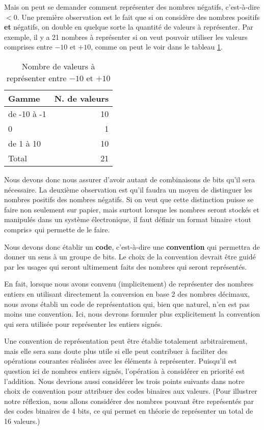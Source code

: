 \documentclass[11pt]{article}
\begin{document}
Mais on peut se demander comment représenter des nombres négatifs,
c'est-à-dire \(< 0\). Une première observation est le fait que si on
considère des nombres positifs \textbf{et} négatifs, on double en quelque
sorte la quantité de valeurs à représenter. Par exemple, il y a 21
nombres à représenter si on veut pouvoir utiliser les valeurs
comprises entre \(-10\) et \(+10\), comme on peut le voir dans le
tableau \ref{tab:orgaae360a}.

\begin{table}[htbp]
\caption{\label{tab:orgaae360a}Nombre de valeurs à représenter entre \(-10\) et \(+10\)}
\centering
\begin{tabular}{lr}
Gamme & N. de valeurs\\[0pt]
\hline
de -10 à -1 & 10\\[0pt]
0 & 1\\[0pt]
de 1 à 10 & 10\\[0pt]
\hline
Total & 21\\[0pt]
\end{tabular}
\end{table}

Nous devons donc nous assurer d'avoir autant de combinaisons de bits
qu'il sera nécessaire. La deuxième observation est qu'il faudra un
moyen de distinguer les nombres positifs des nombres négatifs. Si on
veut que cette distinction puisse se faire non seulement sur papier,
mais surtout lorsque les nombres seront stockés et manipulés dans un
système électronique, il faut définir un format binaire «tout compris»
qui permette de le faire.

Nous devons donc établir un \textbf{code}, c'est-à-dire une \textbf{convention} qui
permettra de donner un sens à un groupe de bits. Le choix de la
convention devrait être guidé par les usages qui seront ultimement
faits des nombres qui seront représentés.

En fait, lorsque nous avons convenu (implicitement) de représenter des
nombres entiers en utilisant directement la conversion en base 2 des
nombres décimaux, nous avons établi un code de représentation qui,
bien que naturel, n'en est pas moins une convention. Ici, nous devrons
formuler plus explicitement la convention qui sera utilisée pour
représenter les entiers signés.

Une convention de représentation peut être établie totalement
arbitrairement, mais elle sera sans doute plus utile si elle peut
contribuer à faciliter des opérations courantes réalisées avec les
éléments à représenter. Puisqu'il est question ici de nombres entiers
signés, l'opération à considérer en priorité est l'addition. Nous devrions 
aussi considérer les trois points suivants dans notre choix de
convention pour attribuer des codes binaires aux valeurs. (Pour
illustrer notre réflexion, nous allons considérer des nombres pouvant
être représentés par des codes binaires de 4 bits, ce qui permet
en théorie de représenter un total de 16 valeurs.)
\end{document}

